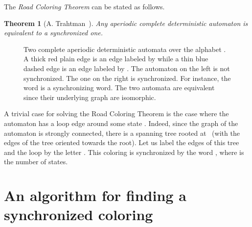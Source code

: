 \documentclass[11pt,a4paper]{article}
\newtheorem{theorem}{Theorem}
\begin{document}
The \emph{Road Coloring Theorem} can be stated as follows.

\begin{theorem}[A. Trahtman~\cite{Trahtman09}] \label{theorem.road}
Any aperiodic complete deterministic automaton is equivalent to a synchronized one.
\end{theorem}

\begin{figure}[htbp]
    \centering
{}
        \caption{Two complete aperiodic deterministic automata
          over the alphabet . A thick red plain edge is an edge labeled by
           while a thin blue dashed edge is an edge labeled by
          . The automaton on the left is not synchronized.  The one
          on the right is synchronized. For instance, the word 
          is a synchronizing word. The two automata are equivalent
          since their underlying graph are isomorphic.}\label{figure.automate1}
\end{figure}

A trivial case for solving the Road Coloring Theorem is the case where
the automaton has a loop edge around some state 
\cite{OBrien81}. Indeed, since the graph of the automaton is strongly
connected, there is a spanning tree rooted at~ (with the edges of
the tree oriented towards the root). Let us label the edges of this
tree and the loop by the letter . This coloring is synchronized by
the word , where  is the number of states.

\section{An algorithm for finding a synchronized coloring} \label{section.algo}
\end{document}
